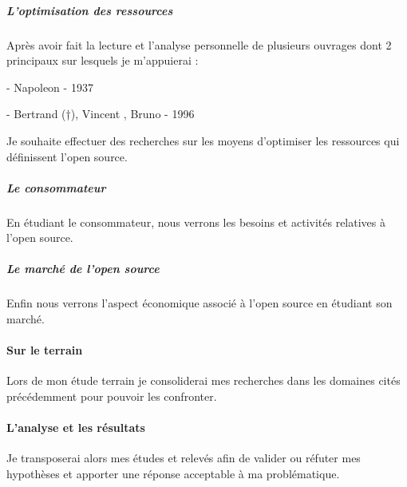 			\subparagraph{L'optimisation des ressources\\}
		
				Après avoir fait la lecture et l'analyse personnelle de plusieurs ouvrages dont 2 principaux sur lesquels je m'appuierai : 
		
				\begin{displayquote}
					 - Napoleon  - 1937
				\end{displayquote}
				\begin{displayquote}
					 - Bertrand  (†), Vincent , Bruno \bsc{Jarrosson} - 1996
				\end{displayquote}
		
				Je souhaite effectuer des recherches sur les moyens d'optimiser les ressources qui définissent l'open source.

			\subparagraph{Le consommateur\\}
				En étudiant le consommateur, nous verrons les besoins et activités relatives à l'open source.

			\subparagraph{Le marché de l'open source\\}
				Enfin nous verrons l'aspect économique associé à l'open source en étudiant son marché.

		\paragraph{Sur le terrain \\}
			Lors de mon étude terrain je consoliderai mes recherches dans les domaines cités précédemment pour pouvoir les confronter.

		\paragraph{L'analyse et les résultats \\}
			Je transposerai alors mes études et relevés afin de valider ou réfuter mes hypothèses et apporter une réponse acceptable à ma problématique.
